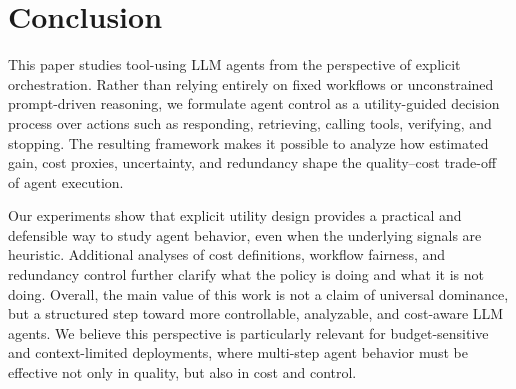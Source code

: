 \section{Conclusion}

This paper studies tool-using LLM agents from the perspective of explicit orchestration. Rather than relying entirely on fixed workflows or unconstrained prompt-driven reasoning, we formulate agent control as a utility-guided decision process over actions such as responding, retrieving, calling tools, verifying, and stopping. The resulting framework makes it possible to analyze how estimated gain, cost proxies, uncertainty, and redundancy shape the quality--cost trade-off of agent execution.

Our experiments show that explicit utility design provides a practical and defensible way to study agent behavior, even when the underlying signals are heuristic. Additional analyses of cost definitions, workflow fairness, and redundancy control further clarify what the policy is doing and what it is not doing. Overall, the main value of this work is not a claim of universal dominance, but a structured step toward more controllable, analyzable, and cost-aware LLM agents.
We believe this perspective is particularly relevant for budget-sensitive and context-limited deployments, where multi-step agent behavior must be effective not only in quality, but also in cost and control.